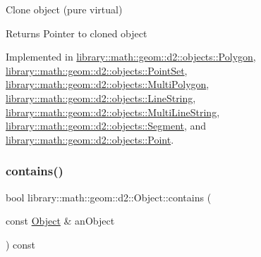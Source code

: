 Clone object (pure virtual) 

\begin{DoxyReturn}{Returns}
Pointer to cloned object 
\end{DoxyReturn}


Implemented in \hyperlink{classlibrary_1_1math_1_1geom_1_1d2_1_1objects_1_1_polygon_a15bbbe7e468a50d6059e2df946175e1c}{library\+::math\+::geom\+::d2\+::objects\+::\+Polygon}, \hyperlink{classlibrary_1_1math_1_1geom_1_1d2_1_1objects_1_1_point_set_ad867c4fb86734efe968a39c95eba53b3}{library\+::math\+::geom\+::d2\+::objects\+::\+Point\+Set}, \hyperlink{classlibrary_1_1math_1_1geom_1_1d2_1_1objects_1_1_multi_polygon_a6dc8db614de9fb615491deb783fe7fcd}{library\+::math\+::geom\+::d2\+::objects\+::\+Multi\+Polygon}, \hyperlink{classlibrary_1_1math_1_1geom_1_1d2_1_1objects_1_1_line_string_a5b503802b279c6c305fed6a07a893ad2}{library\+::math\+::geom\+::d2\+::objects\+::\+Line\+String}, \hyperlink{classlibrary_1_1math_1_1geom_1_1d2_1_1objects_1_1_multi_line_string_a38054f0f0a2c198b5d3c76ef22562e30}{library\+::math\+::geom\+::d2\+::objects\+::\+Multi\+Line\+String}, \hyperlink{classlibrary_1_1math_1_1geom_1_1d2_1_1objects_1_1_segment_a6149a3cf215b0b573d5bd4f25fad75e9}{library\+::math\+::geom\+::d2\+::objects\+::\+Segment}, and \hyperlink{classlibrary_1_1math_1_1geom_1_1d2_1_1objects_1_1_point_aa6b55bdbf5a0ce9ec8bc91ca79de3569}{library\+::math\+::geom\+::d2\+::objects\+::\+Point}.

\mbox{\label{classlibrary_1_1math_1_1geom_1_1d2_1_1_object_a7bc14e621db51aec72eff0fa5da295ac}} 
\subsubsection{\texorpdfstring{contains()}{contains()}}
{\footnotesize\ttfamily bool library\+::math\+::geom\+::d2\+::\+Object\+::contains (\begin{DoxyParamCaption}\item[{const \hyperlink{classlibrary_1_1math_1_1geom_1_1d2_1_1_object}{Object} \&}]{an\+Object }\end{DoxyParamCaption}) const\hspace{0.3cm}{\ttfamily [virtual]}}



